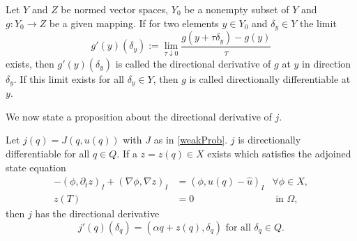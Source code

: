 \begin{defn}
Let $Y$ and $Z$ be normed vector spaces, $Y_0$ be a nonempty subset of $Y$ and $g:Y_0\to Z$ be a given mapping. If for two elements $y\in Y_0$ and $\delta_y\in Y$ the limit
\begin{displaymath}
g'(y)(\delta_y):=\lim_{\tau\downarrow0}\frac{g(y+\tau\delta_y)-g(y)}{\tau}
\end{displaymath}
exists, then $g'(y)(\delta_y)$ is called the directional derivative of $g$ at $y$ in direction $\delta_y$. If this limit exists for all $\delta_y\in Y$, then $g$ is called directionally differentiable at $y$.
\end{defn}
We now state a proposition about the directional derivative of $j$.
\begin{prop}
\label{jDirectionalDerivativeProp}
Let $j(q)=J(q,u(q))$ with $J$ as in \eqref{weakProb}. $j$ is directionally differentiable for all $q\in Q$. If a $z=z(q)\in X$ exists which satisfies the adjoined state equation
\begin{equation}
\label{adjoinedStateEquation}
\begin{aligned}
	-(\phi,\partial_tz)_I+(\nabla \phi,\nabla z)_I&=(\phi, u(q)-\hat{u})_I&\forall\phi\in X,\\
	z(T)&=0&\text{ in }\Omega,
\end{aligned}
\end{equation}
then $j$ has the directional derivative
\begin{equation*}
j'(q)(\delta_q)=(\alpha q+z(q),\delta_q)\text{ for all $\delta_q\in Q$}.
\end{equation*}
\end{prop}
